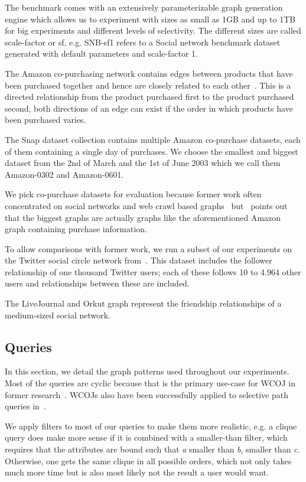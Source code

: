 The benchmark comes with an extensively parameterizable graph generation engine
which allows us to experiment with sizes as small as 1GB and up to 1TB for big experiments and different levels of selectivity.
The different sizes are called scale-factor or sf, e.g. SNB-sf1 refers to a Social network benchmark dataset generated with
default parameters and scale-factor 1.

The Amazon co-purchasing network contains edges between products that have been purchased together and hence are closely related to each other~\cite{snapnets}.
This is a directed relationship from the product purchased first to the product purchased second, both directions of an edge can exist if the order in which
products have been purchased varies.

The Snap dataset collection contains multiple Amazon co-purchase datasets, each of them containing a single day of purchases.
We choose the smallest and biggest dataset from the 2nd of March and the 1st of June 2003 which we call them Amazon-0302 and
Amazon-0601.

We pick co-purchase datasets for evaluation because former work often concentrated on social networks and web crawl based
graphs~\cite{myria-detailed,ammar2018distributed} but~\cite{salihoglu2018} points out that the biggest graphs are actually graphs like
the aforementioned Amazon graph containing purchase information.

To allow comparisons with former work, we run a subset of our experiments on the Twitter social circle network from~\cite{snapnets}.
This dataset includes the follower relationship of one thousand Twitter users; each of these follows 10 to 4.964 other users and
relationships between these are included.

The LiveJournal and Orkut graph represent the friendship relationships of a medium-sized social network.

\subsection{Queries}
In this section, we detail the graph patterns used throughout our experiments.
Most of the queries are cyclic because that is the primary use-case for \textsc{WCOJ} in former research~\cite{olddog,myria-detailed}.
\textsc{WCOJ}s also have been successfully applied to selective path queries in~\cite{olddog,longbin}.

We apply filters to most of our queries to make them more realistic, e.g. a clique query does make more sense if it is combined with a
smaller-than filter, which requires that the attributes are bound such that \textit{a} smaller than \textit{b}, smaller than \textit{c}.
Otherwise, one gets the same clique in all possible orders, which not only takes much more time but is also most
likely not the result a user would want.

